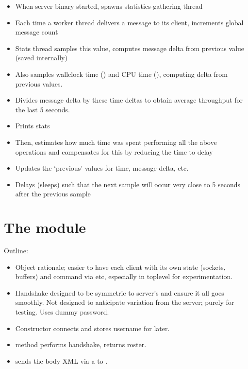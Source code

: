 \documentclass[12pt,a4paper,twoside,openright]{report}
\begin{document}
{\begin{itemize}
  \item When server binary started, spawns statistics-gathering thread
  \item Each time a worker thread delivers a message to its client, increments global message count
  \item Stats thread samples this value, computes message delta from previous value (saved internally)
  \item Also samples wallclock time () and CPU time (), computing delta from previous values.
  \item Divides message delta by these time deltas to obtain average throughput for the last 5 seconds.
  \item Prints stats
  \item Then, estimates how much time was spent performing all the above operations and compensates for this by reducing the time to delay
  \item Updates the `previous' values for time, message delta, etc.
  \item Delays (sleeps) such that the next sample will occur very close to 5 seconds after the previous sample
\end{itemize}

\section{The  module}\label{sec:mod-client}
Outline:

\begin{itemize}
  \item Object rationale; easier to have each client with its own state (sockets, buffers) and command via  etc, especially in toplevel for experimentation.

  \item Handshake designed to be symmetric to server's and ensure it all goes smoothly. Not designed to anticipate variation from the server; purely for testing. Uses dummy password.

  \item Constructor  connects and stores username for later.

  \item {} method performs handshake, returns roster.

  \item {} sends the body XML via a  to .


\end{itemize}}
\end{document}
